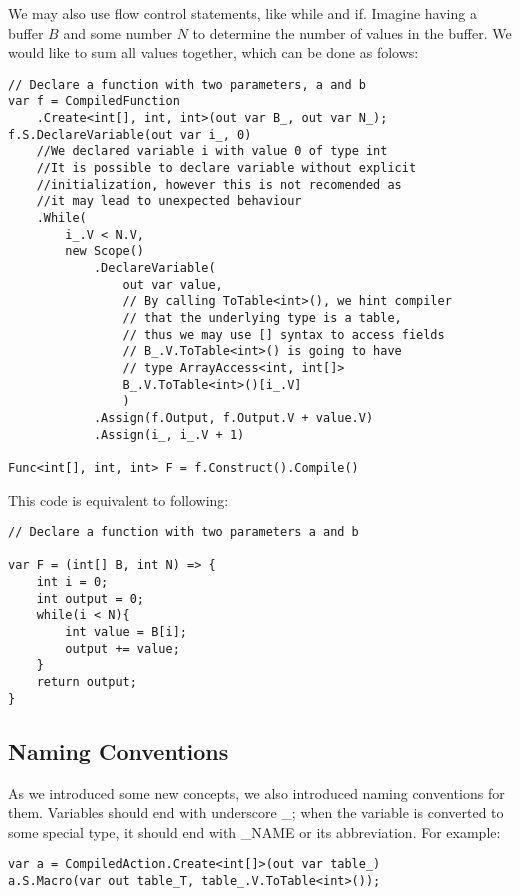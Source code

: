 We may also use flow control statements, like while and if. Imagine having a buffer $B$ and some number $N$ to determine the number of values in the buffer.  We would like to sum all values together, which can be done as folows:
\begin{lstlisting}
// Declare a function with two parameters, a and b
var f = CompiledFunction
    .Create<int[], int, int>(out var B_, out var N_);
f.S.DeclareVariable(out var i_, 0)
    //We declared variable i with value 0 of type int
    //It is possible to declare variable without explicit
    //initialization, however this is not recomended as
    //it may lead to unexpected behaviour
    .While(
        i_.V < N.V, 
        new Scope()
            .DeclareVariable(
                out var value,
                // By calling ToTable<int>(), we hint compiler
                // that the underlying type is a table,
                // thus we may use [] syntax to access fields
                // B_.V.ToTable<int>() is going to have 
                // type ArrayAccess<int, int[]> 
                B_.V.ToTable<int>()[i_.V]
                )
            .Assign(f.Output, f.Output.V + value.V)
            .Assign(i_, i_.V + 1)

Func<int[], int, int> F = f.Construct().Compile()
\end{lstlisting}
This code is equivalent to following:
\begin{lstlisting}
// Declare a function with two parameters a and b

var F = (int[] B, int N) => {
    int i = 0;
    int output = 0;
    while(i < N){
        int value = B[i];
        output += value;
    }
    return output;
}
\end{lstlisting}
\subsection{Naming Conventions}
As we introduced some new concepts, we also introduced naming conventions for them. Variables should end with underscore \_; when the variable is converted to some special type, it should end with \_NAME or its abbreviation. For example:
\begin{lstlisting}
var a = CompiledAction.Create<int[]>(out var table_)
a.S.Macro(var out table_T, table_.V.ToTable<int>());
\end{lstlisting}

